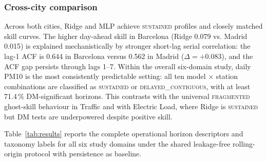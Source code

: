 \documentclass[pdflatex,sn-mathphys]{sn-jnl}
\begin{document}
\subsubsection{Cross-city comparison}
Across both cities, Ridge and MLP achieve \textsc{sustained} profiles and closely matched skill curves. The higher day-ahead skill in Barcelona (Ridge 0.079 vs. Madrid 0.015) is explained mechanistically by stronger short-lag serial correlation: the lag-1 ACF is 0.644 in Barcelona versus 0.562 in Madrid ($\Delta=+0.083$), and the ACF gap persists through lags 1--7.
Within the overall six-domain study, daily PM10 is the most consistently predictable setting: all ten model $\times$ station combinations are classified as \textsc{sustained} or \textsc{delayed\_contiguous}, with at least 71.4\,\% DM-significant horizons. This contrasts with the universal \textsc{fragmented} ghost-skill behaviour in Traffic and with Electric Load, where Ridge is \textsc{sustained} but DM tests are underpowered despite positive skill.

Table~\ref{tab:results} reports the complete operational horizon descriptors and taxonomy labels for all six study domains under the shared leakage-free rolling-origin protocol with persistence as baseline.
\end{document}
